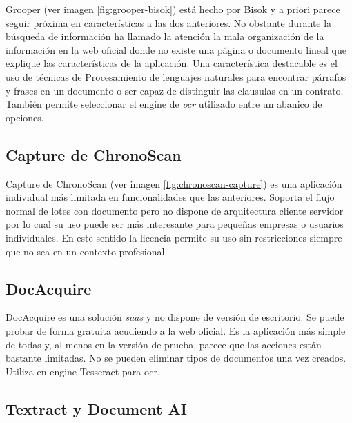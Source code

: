 Grooper \cite{solucionesComerciales_bisok_grooper} (ver imagen \ref{fig:grooper-bisok}) está hecho por Bisok y a priori parece seguir próxima en características a las dos anteriores. No obstante durante la búsqueda de información ha llamado la atención la mala organización de la información en la web oficial donde no existe una página o documento lineal que explique las características de la aplicación. Una característica destacable es el uso de técnicas de Procesamiento de lenguajes naturales para encontrar párrafos y frases en un documento o ser capaz de distinguir las clausulas en un contrato. También permite seleccionar el engine de \emph{\acrlong{ocr}} utilizado entre un abanico de opciones.

\subsection{Capture de ChronoScan}

Capture de ChronoScan \cite{solucionesComerciales_chronoScanCapture_chronoScanDocumentCapture} (ver imagen \ref{fig:chronoscan-capture}) es una aplicación individual más limitada en funcionalidades que las anteriores. Soporta el flujo normal de lotes con documento pero no dispone de arquitectura cliente servidor por lo cual su uso puede ser más interesante para pequeñas empresas o usuarios individuales. En este sentido la licencia permite su uso sin restricciones siempre que no sea en un contexto profesional.

\subsection{DocAcquire}

DocAcquire \cite{solucionesComerciales_docAcquire_docAcquire} es una solución \emph{\acrlong{saas}} y no dispone de versión de escritorio. Se puede probar de forma gratuita acudiendo a la web oficial. Es la aplicación más simple de todas y, al menos en la versión de prueba, parece que las acciones están bastante limitadas. No se pueden eliminar tipos de documentos una vez creados. Utiliza en engine Tesseract para \acrshort{ocr}.

\subsection{Textract y Document AI}

